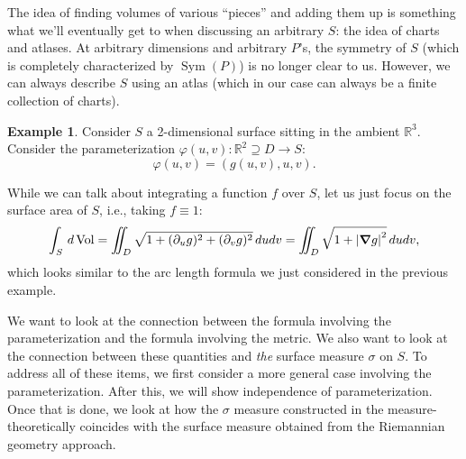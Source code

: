 \documentclass{article}
\theoremstyle{definition}
\newtheorem{exmp}{Example}[section]
\newcommand\Sym{\operatorname{Sym}}
\newcommand{\p}{\partial}
\newcommand{\R}{\mathbb{R}}
\theoremstyle{theorem}
\newcommand{\Vol}{\operatorname{Vol}}
\begin{document}
The idea of finding volumes of various ``pieces'' and adding them up is something what we'll eventually get to when discussing an arbitrary $S$: the idea of charts and atlases. At arbitrary dimensions and arbitrary $P$'s, the symmetry of $S$ (which is completely characterized by $\Sym(P)$) is no longer clear to us. However, we can always describe $S$ using an atlas (which in our case can always be a finite collection of charts). 




\begin{exmp}
Consider $S$ a 2-dimensional surface sitting in the ambient $\R^3$. Consider the parameterization $\varphi(u,v): \R^2 \supseteq D \to S$:
\begin{equation*}
    \varphi(u,v) = (g(u,v) , u,v).
\end{equation*}


While we can talk about integrating a function $f$ over $S$, let us just focus on the surface area of $S$, i.e., taking $f\equiv 1$: 
\begin{equation*}
    \int_{S}\,d\Vol = \iint_{D}\sqrt{1 + (\p_{u} g)^2 + (\p_v g)^2} \,du dv = \iint_{D} \sqrt{1 + \abs{\grad g}^2} \,du dv,
\end{equation*}
which looks similar to the arc length formula we just considered in the previous example. 
\end{exmp}  
  


We want to look at the connection between the formula involving the parameterization and the formula involving the metric. We also want to look at the connection between these quantities and \textit{the} surface measure $\sigma$ on $S$. To address all of these items, we first consider a more general case involving the parameterization. After this, we will show independence of parameterization. Once that is done, we look at how the $\sigma$ measure constructed in the measure-theoretically coincides with the surface measure obtained from the Riemannian geometry approach.\\
\end{document}
